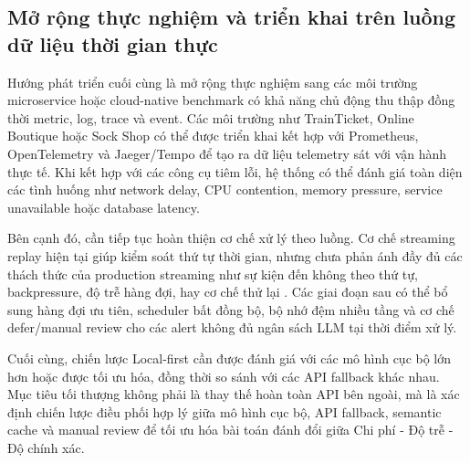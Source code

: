 \subsection{Mở rộng thực nghiệm và triển khai trên luồng dữ liệu thời gian thực}

Hướng phát triển cuối cùng là mở rộng thực nghiệm sang các môi trường microservice hoặc cloud-native benchmark có khả năng chủ động thu thập đồng thời metric, log, trace và event. Các môi trường như TrainTicket, Online Boutique hoặc Sock Shop có thể được triển khai kết hợp với Prometheus, OpenTelemetry và Jaeger/Tempo để tạo ra dữ liệu telemetry sát với vận hành thực tế. Khi kết hợp với các công cụ tiêm lỗi, hệ thống có thể đánh giá toàn diện các tình huống như network delay, CPU contention, memory pressure, service unavailable hoặc database latency.

Bên cạnh đó, cần tiếp tục hoàn thiện cơ chế xử lý theo luồng. Cơ chế streaming replay hiện tại giúp kiểm soát thứ tự thời gian, nhưng chưa phản ánh đầy đủ các thách thức của production streaming như sự kiện đến không theo thứ tự, backpressure, độ trễ hàng đợi, hay cơ chế thử lại . Các giai đoạn sau có thể bổ sung hàng đợi ưu tiên, scheduler bất đồng bộ, bộ nhớ đệm nhiều tầng và cơ chế defer/manual review cho các alert không đủ ngân sách LLM tại thời điểm xử lý.

Cuối cùng, chiến lược Local-first cần được đánh giá với các mô hình cục bộ lớn hơn hoặc được tối ưu hóa, đồng thời so sánh với các API fallback khác nhau. Mục tiêu tối thượng không phải là thay thế hoàn toàn API bên ngoài, mà là xác định chiến lược điều phối hợp lý giữa mô hình cục bộ, API fallback, semantic cache và manual review để tối ưu hóa bài toán đánh đổi giữa Chi phí - Độ trễ - Độ chính xác.

